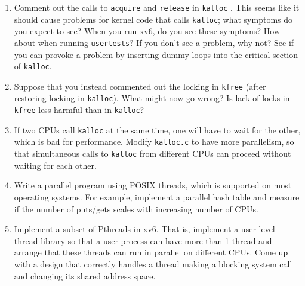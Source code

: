 \begin{enumerate}
  
\item Comment out the calls to
\lstinline{acquire}
and
\lstinline{release}
in
\lstinline{kalloc}
.
This seems like it should cause problems for
kernel code that calls
\lstinline{kalloc};
what symptoms do you expect to see?
When you run xv6, do you see these symptoms?
How about when running
\lstinline{usertests}?
If you don't see a problem, why not?
See if you can provoke a problem by inserting
dummy loops into the critical section of
\lstinline{kalloc}.

\item Suppose that you instead commented out the
locking in
\lstinline{kfree} 
(after restoring locking in
\lstinline{kalloc}).
What might now go wrong? Is lack of locks in
\lstinline{kfree}
less harmful than in
\lstinline{kalloc}?

\item If two CPUs call
\lstinline{kalloc}
at the same time, one will have to wait for the other,
which is bad for performance.
Modify 
\lstinline{kalloc.c}
to have more parallelism, so that simultaneous
calls to
\lstinline{kalloc}
from different CPUs can proceed without waiting for each other.

\item Write a parallel program using POSIX threads, which is supported on most
operating systems. For example, implement a parallel hash table and measure if
the number of puts/gets scales with increasing number of CPUs.

\item Implement a subset of Pthreads in xv6.  That is, implement a user-level
thread library so that a user process can have more than 1 thread and arrange
that these threads can run in parallel on different CPUs.  Come up with a
design that correctly handles a thread making a blocking system call and
changing its shared address space.

\end{enumerate}

